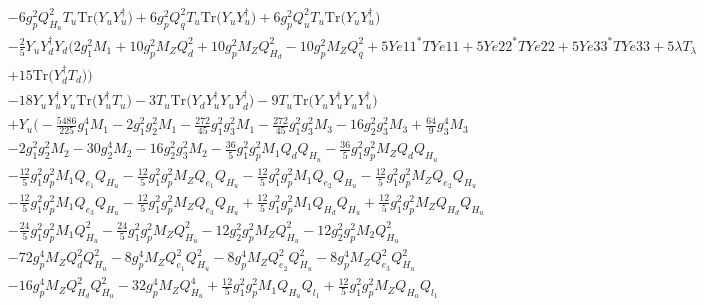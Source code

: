 \begin{align}
 &-6 g_{p}^{2} Q_{H_u}^{2} T_u \mbox{Tr}\Big({Y_u  Y_{u}^{\dagger}}\Big) +6 g_{p}^{2} Q_{q}^{2} T_u \mbox{Tr}\Big({Y_u  Y_{u}^{\dagger}}\Big) +6 g_{p}^{2} Q_{u}^{2} T_u \mbox{Tr}\Big({Y_u  Y_{u}^{\dagger}}\Big) \nonumber \\ 
 &-\frac{2}{5} {Y_u  Y_{d}^{\dagger}  Y_d} \Big(2 g_{1}^{2} M_1 +10 g_{p}^{2} M_Z Q_{d}^{2} +10 g_{p}^{2} M_Z Q_{H_d}^{2} -10 g_{p}^{2} M_Z Q_{q}^{2} +5 Ye11^* TYe11 +5 Ye22^* TYe22 +5 Ye33^* TYe33 +5 \lambda T_{\lambda} \nonumber \\ 
 &+15 \mbox{Tr}\Big({Y_{d}^{\dagger}  T_d}\Big) \Big)\nonumber \\ 
 &-18 {Y_u  Y_{u}^{\dagger}  Y_u} \mbox{Tr}\Big({Y_{u}^{\dagger}  T_u}\Big) -3 T_u \mbox{Tr}\Big({Y_d  Y_{u}^{\dagger}  Y_u  Y_{d}^{\dagger}}\Big) -9 T_u \mbox{Tr}\Big({Y_u  Y_{u}^{\dagger}  Y_u  Y_{u}^{\dagger}}\Big) \nonumber \\ 
 &+Y_u \Big(-\frac{5486}{225} g_{1}^{4} M_1 -2 g_{1}^{2} g_{2}^{2} M_1 -\frac{272}{45} g_{1}^{2} g_{3}^{2} M_1 -\frac{272}{45} g_{1}^{2} g_{3}^{2} M_3 -16 g_{2}^{2} g_{3}^{2} M_3 +\frac{64}{9} g_{3}^{4} M_3 \nonumber \\ 
 &-2 g_{1}^{2} g_{2}^{2} M_2 -30 g_{2}^{4} M_2 -16 g_{2}^{2} g_{3}^{2} M_2 -\frac{36}{5} g_{1}^{2} g_{p}^{2} M_1 Q_{d} Q_{H_u} -\frac{36}{5} g_{1}^{2} g_{p}^{2} M_Z Q_{d} Q_{H_u} \nonumber \\ 
 &-\frac{12}{5} g_{1}^{2} g_{p}^{2} M_1 Q_{e_{1}} Q_{H_u} -\frac{12}{5} g_{1}^{2} g_{p}^{2} M_Z Q_{e_{1}} Q_{H_u} -\frac{12}{5} g_{1}^{2} g_{p}^{2} M_1 Q_{e_{2}} Q_{H_u} -\frac{12}{5} g_{1}^{2} g_{p}^{2} M_Z Q_{e_{2}} Q_{H_u} \nonumber \\ 
 &-\frac{12}{5} g_{1}^{2} g_{p}^{2} M_1 Q_{e_3} Q_{H_u} -\frac{12}{5} g_{1}^{2} g_{p}^{2} M_Z Q_{e_3} Q_{H_u} +\frac{12}{5} g_{1}^{2} g_{p}^{2} M_1 Q_{H_d} Q_{H_u} +\frac{12}{5} g_{1}^{2} g_{p}^{2} M_Z Q_{H_d} Q_{H_u} \nonumber \\ 
 &-\frac{24}{5} g_{1}^{2} g_{p}^{2} M_1 Q_{H_u}^{2} -\frac{24}{5} g_{1}^{2} g_{p}^{2} M_Z Q_{H_u}^{2} -12 g_{2}^{2} g_{p}^{2} M_Z Q_{H_u}^{2} -12 g_{2}^{2} g_{p}^{2} M_2 Q_{H_u}^{2} \nonumber \\ 
 &-72 g_{p}^{4} M_Z Q_{d}^{2} Q_{H_u}^{2} -8 g_{p}^{4} M_Z Q_{e_{1}}^{2} Q_{H_u}^{2} -8 g_{p}^{4} M_Z Q_{e_{2}}^{2} Q_{H_u}^{2} -8 g_{p}^{4} M_Z Q_{e_3}^{2} Q_{H_u}^{2} \nonumber \\ 
 &-16 g_{p}^{4} M_Z Q_{H_d}^{2} Q_{H_u}^{2} -32 g_{p}^{4} M_Z Q_{H_u}^{4} +\frac{12}{5} g_{1}^{2} g_{p}^{2} M_1 Q_{H_u} Q_{l_1} +\frac{12}{5} g_{1}^{2} g_{p}^{2} M_Z Q_{H_u} Q_{l_1} \nonumber \\ 

\end{align}
